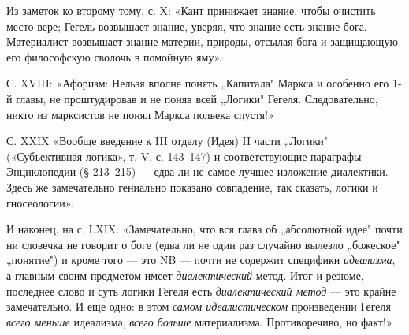 Из  заметок ко  второму  тому,  с. X:  «Кант  принижает знание,  чтобы
очистить место вере; Гегель возвышает  знание, уверяя, что знание есть
знание бога.  Материалист возвышает  знание материи,  природы, отсылая
бога и защищающую его философскую сволочь в помойную яму».

С. XVIII: «Афоризм: Нельзя вполне  понять „Капитала" Маркса и особенно
его  1-й главы,  не проштудировав  и  не поняв  всей „Логики"  Гегеля.
Следовательно, никто из марксистов не понял Маркса полвека спустя!»

С.  XXIX  «Вообще введение  к  III  отделу  (Идея) II  части  „Логики"
(«Субъективная логика», т. V, с. 143--147) и соответствующие параграфы
Энциклопедии  (§  213--215) ---  едва  ли  не самое  лучшее  изложение
диалектики. Здесь  же замечательно гениально показано  совпадение, так
сказать, логики и гносеологии».

И наконец,  на с.  LXIX: «Замечательно, что  вся глава  об „абсолютной
идее"  почти ни  словечка  не говорит  о  боге (едва  ли  не один  раз
случайно  вылезло  „божеское"  „понятие")  и кроме  того  ---  это  NB
---  почти не  содержит  специфики \emph{идеализма},  а главным  своим
предметом имеет \emph{диалектический} метод.  Итог и резюме, последнее
слово и  суть логики Гегеля  есть \emph{диалектический метод}  --- это
крайне замечательно.  И еще одно: в  этом \emph{самом идеалистическом}
произведении Гегеля \emph{всего меньше} идеализма, \emph{всего больше}
материализма. Противоречиво, но факт!»

